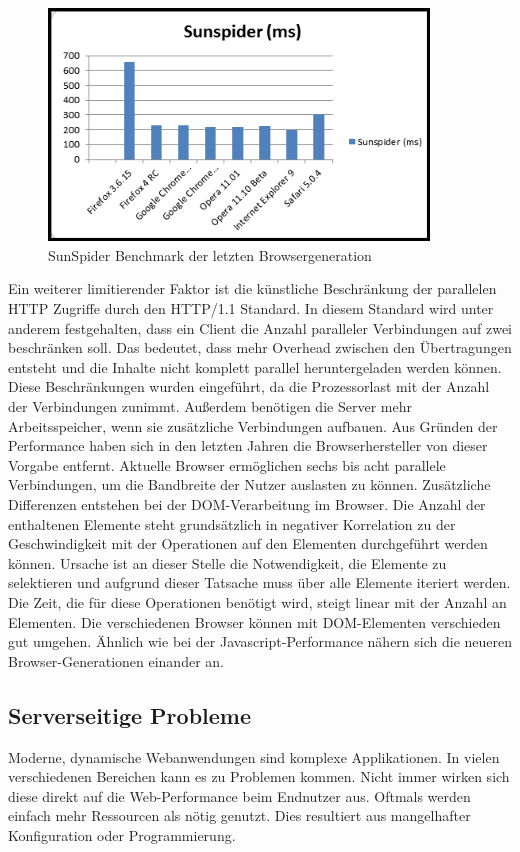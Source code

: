 \begin{figure}[!ht]
  \centering
  \includegraphics[width=0.9\textwidth]{material/sunspiderbenchmark.png}
  \caption{SunSpider Benchmark der letzten Browsergeneration}
  \label{fig:sunspider}
\end{figure}
Ein weiterer limitierender Faktor ist die künstliche Beschränkung der parallelen HTTP Zugriffe durch den HTTP/1.1 Standard. In diesem Standard wird unter anderem festgehalten, dass ein Client die Anzahl paralleler Verbindungen auf zwei beschränken soll. \citep{Fielding1999}
Das bedeutet, dass mehr Overhead zwischen den Übertragungen entsteht und die Inhalte nicht komplett parallel heruntergeladen werden k\"onnen. Diese Beschränkungen wurden eingeführt, da die Prozessorlast mit der Anzahl der Verbindungen zunimmt. Außerdem benötigen die Server mehr Arbeitsspeicher, wenn sie zusätzliche Verbindungen aufbauen. Aus Gr\"unden der Performance haben sich in den letzten Jahren die Browserhersteller von dieser Vorgabe entfernt. Aktuelle Browser ermöglichen sechs bis acht parallele Verbindungen, um die Bandbreite der Nutzer auslasten zu können. 
Zus\"atzliche Differenzen entstehen bei der DOM-Verarbeitung im Browser. Die Anzahl der enthaltenen Elemente steht grunds\"atzlich in negativer Korrelation zu der Geschwindigkeit mit der Operationen auf den Elementen durchgef\"uhrt werden k\"onnen. Ursache ist an dieser Stelle die Notwendigkeit, die Elemente zu selektieren und aufgrund dieser Tatsache muss \"uber alle Elemente iteriert werden. Die Zeit, die f\"ur diese Operationen ben\"otigt wird, steigt linear mit der Anzahl an Elementen.\citep{YahooDevNetwork2011}
Die verschiedenen Browser k\"onnen mit DOM-Elementen verschieden gut umgehen. \"Ahnlich wie bei der Javascript-Performance n\"ahern sich die neueren Browser-Generationen einander an.

\subsection{Serverseitige Probleme}
Moderne, dynamische Webanwendungen sind komplexe Applikationen. In vielen verschiedenen Bereichen kann es zu Problemen kommen. Nicht immer wirken sich diese direkt auf die Web-Performance beim Endnutzer aus. Oftmals werden einfach mehr Ressourcen als n\"otig genutzt. Dies resultiert aus mangelhafter Konfiguration oder Programmierung. 


